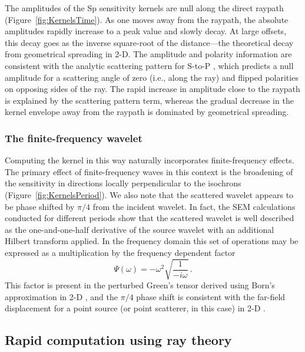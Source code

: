 \documentclass[referee]{gji}
\begin{document}
The amplitudes of the Sp sensitivity kernels are null along the direct raypath (Figure~\ref{fig:KernelsTime}).  As one moves away from the raypath, the absolute amplitudes rapidly increase to a peak value and slowly decay.  At large offsets, this decay goes as the inverse square-root of the distance---the theoretical decay from geometrical spreading in 2-D.  The amplitude and polarity information are consistent with the analytic scattering pattern for S-to-P \citep{Wu1985, Bostock1999, Rondenay2009, Sato2012}, which predicts a null amplitude for a scattering angle of zero (i.e., along the ray) and flipped polarities on opposing sides of the ray.  The rapid increase in amplitude close to the raypath is explained by the scattering pattern term, whereas the gradual decrease in the kernel envelope away from the raypath is dominated by geometrical spreading.

\subsubsection{The finite-frequency wavelet}

Computing the kernel in this way naturally incorporates finite-frequency effects.  The primary effect of finite-frequency waves in this context is the broadening of the sensitivity in directions locally perpendicular to the isochrons (Figure~\ref{fig:KernelsPeriod}).  We also note that the scattered wavelet appears to be phase shifted by $\pi/4$ from the incident wavelet.  In fact, the SEM calculations conducted for different periods show that the scattered wavelet is well described as the one-and-one-half derivative of the source wavelet with an additional Hilbert transform applied.  In the frequency domain this set of operations may be expressed as a multiplication by the frequency dependent factor
\begin{equation}
\label{eqn:FrequencyFactor}
\Psi(\omega) = -\omega^2 \sqrt{\frac{1}{-i\omega}} \, .
\end{equation}
This factor is present in the perturbed Green's tensor derived using Born's approximation in 2-D \citep{Bostock1999}, and the $\pi/4$ phase shift is consistent with the far-field displacement for a point source (or point scatterer, in this case) in 2-D \citep[e.g.,][]{Frazer1980, Hudson1980}.

\subsection{Rapid computation using ray theory}
\end{document}

